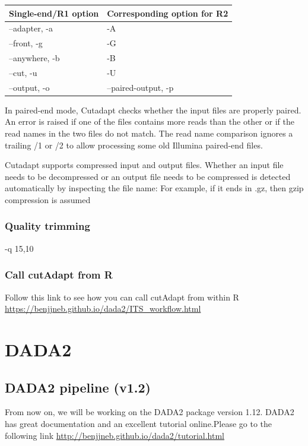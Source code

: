 \documentclass[
]{book}
\begin{document}
\begin{longtable}[]{@{}ll@{}}
\toprule
Single-end/R1 option & Corresponding option for R2\tabularnewline
\midrule
\endhead
--adapter, -a & -A\tabularnewline
--front, -g & -G\tabularnewline
--anywhere, -b & -B\tabularnewline
--cut, -u & -U\tabularnewline
--output, -o & --paired-output, -p\tabularnewline
\bottomrule
\end{longtable}

In paired-end mode, Cutadapt checks whether the input files are properly paired. An error is raised if one of the files contains more reads than the other or if the read names in the two files do not match. The read name comparison ignores a trailing /1 or /2 to allow processing some old Illumina paired-end files.

Cutadapt supports compressed input and output files. Whether an input file needs to be decompressed or an output file needs to be compressed is detected automatically by inspecting the file name: For example, if it ends in .gz, then gzip compression is assumed

\hypertarget{quality-trimming}{%
\subsection{Quality trimming}\label{quality-trimming}}

-q 15,10

\hypertarget{call-cutadapt-from-r}{%
\subsection{Call cutAdapt from R}\label{call-cutadapt-from-r}}

Follow this link to see how you can call cutAdapt from within R
\url{https://benjjneb.github.io/dada2/ITS_workflow.html}

\hypertarget{dada2}{%
\chapter{DADA2}\label{dada2}}

\hypertarget{dada2-pipeline-v1.2}{%
\section{DADA2 pipeline (v1.2)}\label{dada2-pipeline-v1.2}}

From now on, we will be working on the DADA2 package version 1.12. DADA2 has great documentation and an excellent tutorial online.Please go to the following link \url{http://benjjneb.github.io/dada2/tutorial.html}
\end{document}
